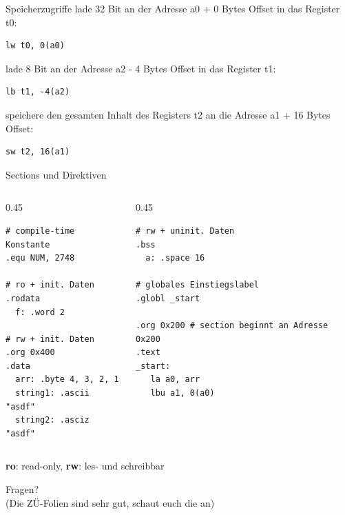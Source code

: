 \begin{frame}[c, fragile]{Speicherzugriffe}{}
	lade 32 Bit an der Adresse a0 + 0 Bytes Offset in das Register t0:
	\begin{verbatim}lw t0, 0(a0)\end{verbatim}
	lade 8 Bit an der Adresse a2 - 4 Bytes Offset in das Register t1:
	\begin{verbatim}lb t1, -4(a2)\end{verbatim}
	speichere den gesamten Inhalt des Registers t2 an die Adresse a1 + 16 Bytes Offset:
	\begin{verbatim}sw t2, 16(a1)\end{verbatim}
\end{frame}

\begin{frame}[c, fragile]{Sections und Direktiven}
	\begin{columns}[c]
		\begin{column}{0.45\textwidth}
			\begin{verbatim}
# compile-time Konstante
.equ NUM, 2748

# ro + init. Daten
.rodata
  f: .word 2

# rw + init. Daten
.org 0x400
.data
  arr: .byte 4, 3, 2, 1
  string1: .ascii "asdf"
  string2: .asciz "asdf"
        \end{verbatim}
		\end{column}
		\begin{column}{0.45\textwidth}
			\begin{verbatim}
# rw + uninit. Daten
.bss
  a: .space 16

# globales Einstiegslabel
.globl _start

.org 0x200 # section beginnt an Adresse 0x200
.text
_start:
   la a0, arr
   lbu a1, 0(a0)
      \end{verbatim}
		\end{column}
	\end{columns}
	\begin{center}
		\small{\textbf{ro}: read-only, \textbf{rw}: les- und schreibbar}
	\end{center}
\end{frame}


\begin{frame}[c]{}{}
	\begin{center}
		\LARGE Fragen?\\
		\Large (Die ZÜ-Folien sind sehr gut, schaut euch die an)
	\end{center}
\end{frame}

